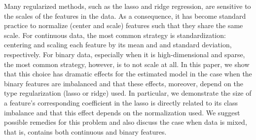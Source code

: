 Many regularized methods, such as the lasso and ridge regression, are sensitive to the scales of the features in the data. As a consequence, it has become standard practice to normalize (center and scale) features such that they share the same scale. For continuous data, the most common strategy is standardization: centering and scaling each feature by its mean and and standard deviation, respectively. For binary data, especially when it is high-dimensional and sparse, the most common strategy, however, is to not scale at all. In this paper, we show that this choice has dramatic effects for the estimated model in the case when the binary features are imbalanced  and that these effects, moreover, depend on the type regularization (lasso or ridge) used. In particular, we demonstrate the size of a feature's corresponding coefficient in the lasso is directly related to its class imbalance and that this effect depends on the normalization used. We suggest possible remedies for this problem and also discuss the case when data is mixed, that is, contains both continuous and binary features.
